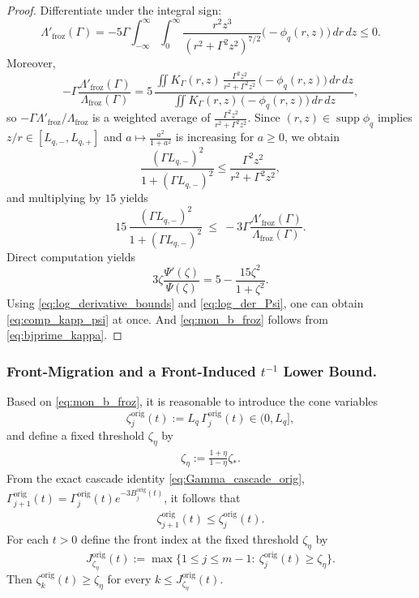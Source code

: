 \documentclass[reqno,11pt]{amsart}
\newcommand{\supp}{\operatorname{supp}}
\begin{document}
\begin{proof}
Differentiate under the integral sign:
\[
\Lambda'_{\mathrm{froz}}(\Gamma)=-5\Gamma\int_{-\infty}^{\infty} \int _{0}^{\infty}
\frac{r^2 z^3}{(r^2+\Gamma^2 z^2)^{7/2}}\big(-\phi_q(r,z) \big)\,dr\,dz\le 0.
\]
Moreover,
\[
-\Gamma\frac{\Lambda'_{\mathrm{froz}}(\Gamma)}{\Lambda_{\mathrm{froz}}(\Gamma)}
=
5\,
\frac{\iint K_\Gamma(r,z)\,\frac{\Gamma^2 z^2}{r^2+\Gamma^2 z^2}\,\big(-\phi_q(r,z) \big)\,dr\,dz}
{\iint K_\Gamma(r,z)\,\big(-\phi_q(r,z) \big)\,dr\,dz},
\]
so $-\Gamma\Lambda'_{\mathrm{froz}}/\Lambda_{\mathrm{froz}}$ is a weighted average of $\frac{\Gamma^2 z^2}{r^2+\Gamma^2 z^2}$.
Since $(r,z)\in\supp\phi_q$ implies $z/r\in[L_{q,-},L_{q,+}]$ and $a\mapsto \frac{a^2}{1+a^2}$ is increasing
for $a\ge 0$, we obtain
\[
\frac{(\Gamma L_{q,-})^2}{1+(\Gamma L_{q,-})^2}\le
\frac{\Gamma^2 z^2}{r^2+\Gamma^2 z^2},
\]
and multiplying by $15$ yields 
\begin{equation}
\label{eq:log_derivative_bounds}
15\,\frac{(\Gamma L_{q,-})^2}{1+(\Gamma L_{q,-})^2}
\ \le\
-3\Gamma\frac{\Lambda'_{\mathrm{froz}}(\Gamma)}{\Lambda_{\mathrm{froz}}(\Gamma)}.
\end{equation}
Direct computation yields
\begin{equation}
\label{eq:log_der_Psi}
    3\zeta \frac{\Psi'(\zeta)}{\Psi(\zeta)}
    =5- \frac{15\zeta^2}{1+\zeta^2}.
\end{equation}
Using \eqref{eq:log_derivative_bounds} and \eqref{eq:log_der_Psi}, one can obtain \eqref{eq:comp_kapp_psi} at once.
And \eqref{eq:mon_b_froz} follows from \eqref{eq:bjprime_kappa}.
\end{proof}

\subsubsection{Front-Migration and a Front-Induced $t^{-1}$ Lower Bound.}
\label{subsec:front_mig}
Based on \eqref{eq:mon_b_froz}, it is reasonable to introduce the cone variables
\[
\zeta_j^{\mathrm{orig}}(t):=L_q\,\Gamma_j^{\mathrm{orig}}(t)\in(0,L_q],
\]
and define a fixed threshold $\zeta_\eta$ by 
\begin{align}
\label{eq:def_xi_eta}
 \zeta_\eta:= \frac{1+\eta}{1- \eta} \zeta_*.
\end{align}
From the exact cascade identity \eqref{eq:Gamma_cascade_orig}, $\Gamma_{j+1}^{\mathrm{orig}}(t)=\Gamma_j^{\mathrm{orig}}(t) e^{-3B_j^{\mathrm{orig}}(t)}$, it follows that  
\begin{align}
\label{eq:ordering_zeta}
\zeta_{j+1}^{\mathrm{orig}}(t)\leq \zeta_j^{\mathrm{orig}}(t).
\end{align}
For each $t>0$ define the front index at the fixed threshold $\zeta_\eta$ by
\begin{equation}
\label{eq:def_front_index_frozen}
J_{\zeta_\eta }^{\mathrm{orig}}(t):=\max\Big\{1\le j\le m-1:\ \zeta_j^{\mathrm{orig}}(t)\ge \zeta_\eta\Big\}.
\end{equation}
Then $\zeta_k^{\mathrm{orig}}(t) \geq \zeta_\eta $ for every $k\leq J_{\zeta_\eta}^{\mathrm{orig}}(t)$.
\end{document}
